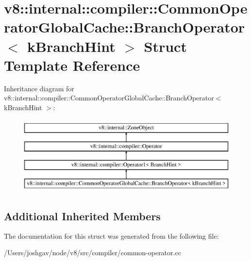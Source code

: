 \hypertarget{structv8_1_1internal_1_1compiler_1_1_common_operator_global_cache_1_1_branch_operator}{}\section{v8\+:\+:internal\+:\+:compiler\+:\+:Common\+Operator\+Global\+Cache\+:\+:Branch\+Operator$<$ k\+Branch\+Hint $>$ Struct Template Reference}
\label{structv8_1_1internal_1_1compiler_1_1_common_operator_global_cache_1_1_branch_operator}
Inheritance diagram for v8\+:\+:internal\+:\+:compiler\+:\+:Common\+Operator\+Global\+Cache\+:\+:Branch\+Operator$<$ k\+Branch\+Hint $>$\+:\begin{figure}[H]
\begin{center}
\leavevmode
\includegraphics[height=4.000000cm]{structv8_1_1internal_1_1compiler_1_1_common_operator_global_cache_1_1_branch_operator}
\end{center}
\end{figure}
\subsection*{Additional Inherited Members}


The documentation for this struct was generated from the following file\+:\begin{DoxyCompactItemize}
\item 
/\+Users/joshgav/node/v8/src/compiler/common-\/operator.\+cc\end{DoxyCompactItemize}
